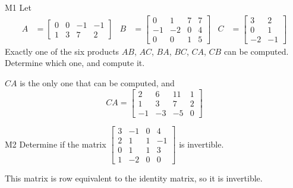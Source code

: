 \documentclass{sbgLAexam}
\begin{document}
\begin{extract}\newpage\end{extract}
\begin{problem}{M1}
Let 
\begin{align*}
A &= \begin{bmatrix} 0 & 0 & -1 & -1 \\ 1 & 3 & 7 & 2 \end{bmatrix} & B &= \begin{bmatrix} 0 & 1 & 7 & 7 \\ -1 & -2 & 0 & 4 \\ 0 & 0 & 1 & 5 \end{bmatrix} & C&=\begin{bmatrix} 3 & 2 \\ 0 & 1 \\ -2 & -1 \end{bmatrix}
\end{align*}
Exactly one of the six products $AB$, $AC$, $BA$, $BC$, $CA$, $CB$ can be computed.  Determine which one, and compute it.
\end{problem}
\begin{solution}
$CA$ is the only one that can be computed, and 
$$CA = \begin{bmatrix} 2 & 6 & 11 & 1 \\ 1 & 3 & 7 & 2 \\ -1 & -3 & -5 & 0 \end{bmatrix}$$
\end{solution}



\begin{problem}{M2}
Determine if the matrix $\begin{bmatrix} 3 & -1 & 0 & 4 \\ 2 & 1 & 1 & -1 \\ 0 & 1 & 1 & 3 \\ 1 & -2 & 0 & 0 \end{bmatrix}$ is invertible.
\end{problem}
\begin{solution}
This matrix is row equivalent to the identity matrix, so it is invertible.
\end{solution}
\end{document}
